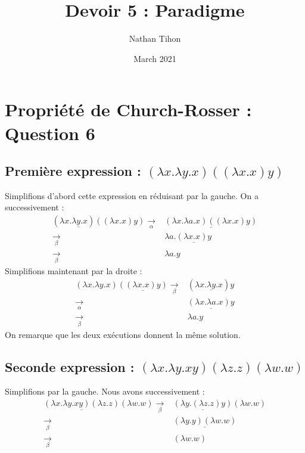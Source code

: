 \documentclass{article}
\title{Devoir 5 : Paradigme}
\author{Nathan Tihon}
\date{March 2021}
\begin{document}
\maketitle
\section{Propriété de Church-Rosser : Question 6}

\subsection{Première expression : $(\lambda x.\lambda y.x)((\lambda x.x) y)$}

\vspace{0.3cm}

\noindent Simplifions d'abord cette expression en réduisant par la gauche. On a successivement :
\begin{align*}
    (\lambda x.\lambda \underline{y}.x)((\lambda x.x) y) \xrightarrow[\alpha]{} &  \underline{(\lambda x. \lambda a.x)((\lambda x.x) y)} \\
    \xrightarrow[ \beta ]{} & \lambda a.\underline{(\lambda x.x)y} \\
    \xrightarrow[ \beta ]{} & \lambda a.y
\end{align*}
Simplifions maintenant par la droite : 
\begin{align*}
    (\lambda x.\lambda y.x)\underline{((\lambda x.x) y)} \xrightarrow[ \beta ]{} & (\lambda x.\underline{\lambda y}.x)y \\
    \xrightarrow[\alpha]{} & \underline{(\lambda x.\lambda a.x)y} \\
    \xrightarrow[ \beta ]{}  & \lambda a.y
\end{align*}
On remarque que les deux exécutions donnent la même solution.

\vspace{0.5cm}

\subsection{Seconde expression : $(\lambda x. \lambda y. x y) (\lambda z.z) (\lambda w.w)$}

\vspace{0.3cm}

\noindent Simplifions par la gauche. Nous avons successivement :
\begin{align*}
    \underline{(\lambda x. \lambda y. x y) (\lambda z.z)} (\lambda w.w) \xrightarrow[\beta]{} & \underline{(\lambda y. (\lambda z. z) y)} (\lambda w.w) \\
    \xrightarrow[\beta]{} & \underline{(\lambda y. y)(\lambda w.w)} \\
    \xrightarrow[\beta]{} & (\lambda w.w)
\end{align*}
\end{document}

